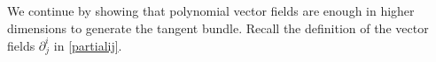 \documentclass[10pt]{amsart}
\theoremstyle{remark}
\newcommand{\R}{\mathbb{R}}
\numberwithin{equation}{section}
\begin{document}

We continue by showing that polynomial vector fields are enough in higher dimensions to generate the tangent bundle. Recall the definition of the vector fields $\partial_j^i$ in \eqref{partialij}.
\end{document}
